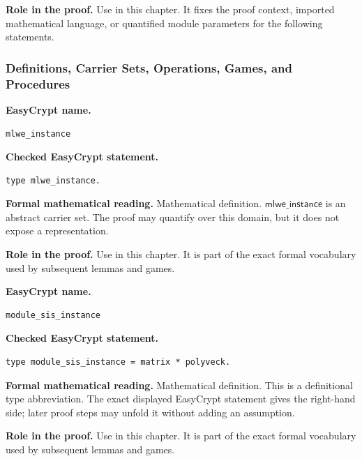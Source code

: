 \noindent\textbf{Role in the proof.}
Use in this chapter. It fixes the proof context, imported mathematical language, or quantified module parameters for the following statements.

\subsubsection*{Definitions, Carrier Sets, Operations, Games, and Procedures}
\begin{formaldefinition}
\noindent\textbf{EasyCrypt name.}
\begin{lstlisting}[language=EasyCrypt,basicstyle=\ttfamily\scriptsize]
mlwe_instance
\end{lstlisting}
\noindent\textbf{Checked EasyCrypt statement.}
\begin{lstlisting}[language=EasyCrypt,basicstyle=\ttfamily\scriptsize]
type mlwe_instance.
\end{lstlisting}
\noindent\textbf{Formal mathematical reading.}
Mathematical definition. \(\mathsf{mlwe\_instance}\) is an abstract carrier set.  The proof may quantify over this domain, but it does not expose a representation.

\noindent\textbf{Role in the proof.}
Use in this chapter. It is part of the exact formal vocabulary used by subsequent lemmas and games.

\end{formaldefinition}

\begin{formaldefinition}
\noindent\textbf{EasyCrypt name.}
\begin{lstlisting}[language=EasyCrypt,basicstyle=\ttfamily\scriptsize]
module_sis_instance
\end{lstlisting}
\noindent\textbf{Checked EasyCrypt statement.}
\begin{lstlisting}[language=EasyCrypt,basicstyle=\ttfamily\scriptsize]
type module_sis_instance = matrix * polyveck.
\end{lstlisting}
\noindent\textbf{Formal mathematical reading.}
Mathematical definition. This is a definitional type abbreviation.  The exact displayed EasyCrypt statement gives the right-hand side; later proof steps may unfold it without adding an assumption.

\noindent\textbf{Role in the proof.}
Use in this chapter. It is part of the exact formal vocabulary used by subsequent lemmas and games.

\end{formaldefinition}


